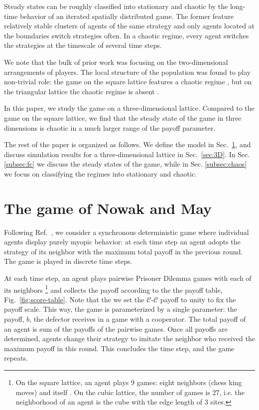 \documentclass[a4paper]{jpconf}
\begin{document}
Steady states can be roughly classified into stationary and chaotic by the long-time behavior of
an iterated spatially distributed game. The former feature relatively stable clusters of agents of the same
strategy and only agents located at the boundaries switch strategies often. In a chaotic regime, every
agent switches the strategies at the timescale of several time steps.

We note that the bulk of prior work was focusing on the two-dimensional arrangements of
players. The local structure of the population was found to play non-trivial
role: the game on the square lattice features a chaotic regime \cite{Nowak1992}, 
but on the triangular lattice the chaotic regime is absent \cite{Burovski2019}.

In this paper, we study the game on a three-dimensional lattice. Compared to 
the game on the square lattice, we find that
the steady state of the game in three dimensions is chaotic in a much larger 
range of the payoff parameter.

The rest of the paper is organized as follows. We define the model in
Sec.\ \ref{sec:model}, and discuss simulation results for a three-dimensional
lattice in Sec.\ \ref{sec:3D}. In Sec. \ref{subsec:fc} we discuss the steady
states of the game, while in Sec. \ref{subsec:chaos} we focus on classifying the
regimes into stationary and chaotic.


\section{The game of Nowak and May}
\label{sec:model}

Following Ref.\ \cite{Nowak1992}, we consider a synchronous deterministic game
where individual agents display purely myopic behavior: at each time step
an agent adopts the strategy of its neighbor with the maximum total payoff
in the previous round. The game is played in discrete time steps. 

At each time step, an agent plays pairwise Prisoner Dilemma games with 
each of its neighbors%
%
\footnote{On the square lattice, an agent plays 9 games: eight neighbors (chess king moves)
and itself \cite{Nowak1993}. On the cubic lattice, the number of games is 27, i.e.
the neighborhood of an agent is the cube with the edge length of 3 sites.}
%
%
and collects the payoff according to the the payoff
table, Fig.\ \ref{fig:score-table}.  Note that the we set the
$\mathcal{C}$-$\mathcal{C}$ payoff to unity to fix the payoff scale. This way, the
game is parameterized by a single parameter: the payoff, $b$, the defector receives
in a game with a cooperator. 
The total payoff of an agent is sum of the payoffs of the pairwise games. Once all 
payoffs are determined, agents change their strategy to imitate the neighbor
who received the maximum payoff in this round. This concludes the time step,
and the game repeats.
\end{document}
